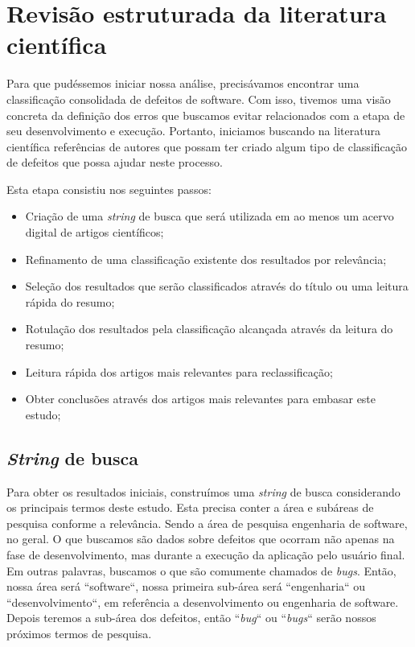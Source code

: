 \chapter{Revisão estruturada da literatura científica}\label{cap:cientific_library_research}

Para que pudéssemos iniciar nossa análise, precisávamos encontrar uma classificação consolidada de defeitos de software. Com isso, tivemos uma visão concreta da definição dos erros que buscamos evitar relacionados com a etapa de seu desenvolvimento e execução. Portanto, iniciamos buscando na literatura científica referências de autores que possam ter criado algum tipo de classificação de defeitos que possa ajudar neste processo.

Esta etapa consistiu nos seguintes passos:

\begin{itemize}
    \item Criação de uma \textit{string} de busca que será utilizada em ao menos um acervo digital de artigos científicos;
    \item Refinamento de uma classificação existente dos resultados por relevância;
    \item Seleção dos resultados que serão classificados através do título ou uma leitura rápida do resumo;
    \item Rotulação dos resultados pela classificação alcançada através da leitura do resumo;
    \item Leitura rápida dos artigos mais relevantes para reclassificação;
    \item Obter conclusões através dos artigos mais relevantes para embasar este estudo;
\end{itemize}

\section{\textit{String} de busca}

Para obter os resultados iniciais, construímos uma \textit{string} de busca considerando os principais termos deste estudo. Esta precisa conter a área e subáreas de pesquisa conforme a relevância. Sendo a área de pesquisa engenharia de software, no geral. O que buscamos são dados sobre defeitos que ocorram não apenas na fase de desenvolvimento, mas durante a execução da aplicação pelo usuário final. Em outras palavras, buscamos o que são comumente chamados de \textit{bugs}. Então, nossa área será ``software``, nossa primeira sub-área será ``engenharia`` ou ``desenvolvimento``, em referência a desenvolvimento ou engenharia de software. Depois teremos a sub-área dos defeitos, então ``\textit{bug}`` ou ``\textit{bugs}`` serão nossos próximos termos de pesquisa. 


